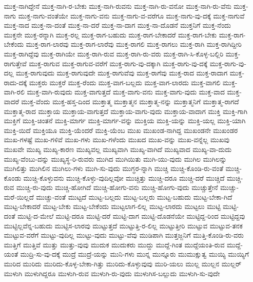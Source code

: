 {ಮುಕ್ತ-ನಾಗಿದ್ದೇನೆ
ಮುಕ್ತ-ನಾಗಿ-ರ-ಬೇಕು
ಮುಕ್ತ-ನಾಗಿ-ರುವನು
ಮುಕ್ತ-ನಾಗಿ-ರು-ವನೋ
ಮುಕ್ತ-ನಾಗಿ-ರು-ವೆನು
ಮುಕ್ತ-ನಾಗು
ಮುಕ್ತ-ನಾಗು-ವಂತೆಯೇ
ಮುಕ್ತ-ನಾಗು-ವನು
ಮುಕ್ತ-ನಾಗು-ವ-ವರೆಗೂ
ಮುಕ್ತ-ನಾಗು-ವು-ದಕ್ಕೆ
ಮುಕ್ತ-ನಾಗುವೆ
ಮುಕ್ತ-ನಾದ
ಮುಕ್ತ-ನಾ-ದಂತೆ
ಮುಕ್ತ-ನಾ-ದರೆ
ಮುಕ್ತ-ನಾ-ದಾಗ
ಮುಕ್ತ-ನಾ-ದೊಡನೆ
ಮುಕ್ತನಿಗೆ
ಮುಕ್ತ-ನೆಂದು
ಮುಕ್ತನೇ
ಮುಕ್ತ-ರನ್ನಾಗಿ
ಮುಕ್ತ-ರಲ್ಲ
ಮುಕ್ತ-ರಾಗ-ಬಹುದು
ಮುಕ್ತ-ರಾಗ-ಬೇಕಾದರೆ
ಮುಕ್ತ-ರಾಗ-ಬೇಕು
ಮುಕ್ತ-ರಾಗ-ಬೇಕೆಂದು
ಮುಕ್ತ-ರಾಗ-ಲಾರವು
ಮುಕ್ತ-ರಾಗ-ಲಾರೆವು
ಮುಕ್ತ-ರಾಗಲಿ
ಮುಕ್ತ-ರಾಗಲು
ಮುಕ್ತ-ರಾಗಿ
ಮುಕ್ತ-ರಾಗಿದ್ದೀರಿ
ಮುಕ್ತ-ರಾಗಿದ್ದೆವು
ಮುಕ್ತ-ರಾಗಿಯೇ
ಮುಕ್ತ-ರಾಗಿ-ರುವ
ಮುಕ್ತ-ರಾಗಿ-ರು-ವರು
ಮುಕ್ತ-ರಾಗಿ-ಸಿ-ಕೊಳ್ಳ-ಬಲ್ಲಿರಿ
ಮುಕ್ತ-ರಾಗುತ್ತೇವೆ
ಮುಕ್ತ-ರಾಗುವ
ಮುಕ್ತ-ರಾಗುವ-ವರೆಗೆ
ಮುಕ್ತ-ರಾಗು-ವು-ದಕ್ಕಾಗಿ
ಮುಕ್ತ-ರಾಗು-ವು-ದಕ್ಕೆ
ಮುಕ್ತ-ರಾಗು-ವು-ದಲ್ಲ
ಮುಕ್ತ-ರಾಗುವುದು
ಮುಕ್ತ-ರಾಗುವುದೇ
ಮುಕ್ತ-ರಾಗುವೆವು
ಮುಕ್ತ-ರಾಗೆವು
ಮುಕ್ತ-ರಾದ
ಮುಕ್ತ-ರಾದಾಗ
ಮುಕ್ತ-ರಾದು-ದಕ್ಕೆ
ಮುಕ್ತರು
ಮುಕ್ತರೆ
ಮುಕ್ತ-ರೆಂದು
ಮುಕ್ತ-ವಾಗ-ಬಲ್ಲದು
ಮುಕ್ತ-ವಾಗ-ಲಾರದು
ಮುಕ್ತ-ವಾಗಲಿ
ಮುಕ್ತ-ವಾಗಿ-ರಲಿ
ಮುಕ್ತ-ವಾಗಿ-ರುವುದು
ಮುಕ್ತ-ವಾಗುತ್ತದೆ
ಮುಕ್ತ-ವಾಗು-ವನು
ಮುಕ್ತ-ವಾಗು-ವುದು
ಮುಕ್ತ-ವಾದ
ಮುಕ್ತ-ವಾದರೆ
ಮುಕ್ತ-ವೆಂದು
ಮುಕ್ತ-ಹಸ್ತ-ದಿಂದ
ಮುಕ್ತಾತ್ಮ
ಮುಕ್ತಾತ್ಮನ
ಮುಕ್ತಾತ್ಮ-ನನ್ನು
ಮುಕ್ತಾತ್ಮನಿಗೆ
ಮುಕ್ತಾತ್ಮ-ರಾಗದೆ
ಮುಕ್ತಾತ್ಮ-ರಾದ
ಮುಕ್ತಾಯ
ಮುಕ್ತಾಯ-ವಾಗುತ್ತದೆ
ಮುಕ್ತಾಯ-ವಾಗು-ವುದು
ಮುಕ್ತಾಯ-ವಾದಾಗ
ಮುಕ್ತಿ
ಮುಕ್ತಿ-ಗಾಗಿ
ಮುಕ್ತಿಗೆ
ಮುಕ್ತಿ-ಚಿಂತನೆ
ಮುಕ್ತಿ-ಮಾರ್ಗ
ಮುಕ್ತಿ-ಮಾರ್ಗ-ವನ್ನು
ಮುಕ್ತಿಯ
ಮುಕ್ತಿ-ಯನ್ನು
ಮುಕ್ತಿ-ಯಲ್ಲ
ಮುಕ್ತಿ-ಯಾಗಿ
ಮುಕ್ತಿ-ಯಿದೆ
ಮುಕ್ತಿಯೂ
ಮುಕ್ತಿ-ಯೆಂದರೆ
ಮುಕ್ತಿ-ಯೆಂಬ
ಮುಖ
ಮುಖಂಡ-ನಾಗಿದ್ದ
ಮುಖಂಡನೇ
ಮುಖಂಡರ
ಮುಖ-ಗಳಷ್ಟೆ
ಮುಖ-ಗಳಿವೆ
ಮುಖ-ಗಳು
ಮುಖ-ಗಳೆಂದು
ಮುಖದ
ಮುಖ-ವನ್ನು
ಮುಖ-ವನ್ನೆಲ್ಲ
ಮುಖವು
ಮುಖವೇ
ಮುಖ್ಯ
ಮುಖ್ಯ-ಕಾರಣ
ಮುಖ್ಯವಲ್ಲ
ಮುಖ್ಯವಾಗಿ
ಮುಖ್ಯ-ವಾಗಿದೆ
ಮುಖ್ಯವಾದ
ಮುಖ್ಯ-ವಾ-ದುದು
ಮುಖ್ಯ-ವೆಂಬು-ದನ್ನು
ಮುಖ್ಯಸ್ಥ-ರಿ-ರುವರು
ಮುಗಿದ
ಮುಗಿಯಿತು
ಮುಗಿ-ಯು-ವುದು
ಮುಗಿಲ
ಮುಗಿಲನ್ನು
ಮುಗಿಲಿತ್ತು
ಮುಗಿಲಿನ
ಮುಗಿಲು-ಗಳು
ಮುಗಿ-ಸು-ವುದು
ಮುಗ್ಧರ-ನ್ನಾಗಿ
ಮುಚ್ಚಿ
ಮುಚ್ಚಿ-ಕೊಂಡಿ-ರು-ವಂತೆ
ಮುಚ್ಚಿ-ಕೊಂಡು
ಮುಚ್ಚಿ-ಕೊಳ್ಳುವನು
ಮುಚ್ಚಿ-ಕೊಳ್ಳು-ವುದಿಲ್ಲವೋ
ಮುಚ್ಚಿತ್ತು
ಮುಚ್ಚಿ-ದರೂ
ಮುಚ್ಚಿ-ದರೆ
ಮುಚ್ಚಿದೆ
ಮುಚ್ಚಿ-ರುವ
ಮುಚ್ಚಿ-ರು-ವುದು
ಮುಚ್ಚಿ-ಹೋಗಿದೆ
ಮುಚ್ಚಿ-ಹೋಗು-ವನು
ಮುಚ್ಚಿ-ಹೋಗು-ವುದು
ಮುಚ್ಚುತ್ತೇನೆ
ಮುಚ್ಚು-ಮರೆ-ಯಿಲ್ಲದೆ
ಮುಚ್ಚು-ವಂತೆ
ಮುಟ್ಟದೆ
ಮುಟ್ಟ-ಬಲ್ಲದು
ಮುಟ್ಟ-ಬಲ್ಲರು
ಮುಟ್ಟ-ಬಹುದು
ಮುಟ್ಟ-ಬೇಕಾ-ಗಿದೆ
ಮುಟ್ಟ-ಬೇಕಾದರೆ
ಮುಟ್ಟ-ಬೇಕು
ಮುಟ್ಟ-ಬೇಕೆಂದು
ಮುಟ್ಟಲಾಗ-ಲಿಲ್ಲ
ಮುಟ್ಟ-ಲಾರದು
ಮುಟ್ಟಲು
ಮುಟ್ಟಿ
ಮುಟ್ಟಿ-ದಂತೆ
ಮುಟ್ಟಿ-ದ-ಮೇಲೆ
ಮುಟ್ಟಿ-ದರೂ
ಮುಟ್ಟಿ-ದರೆ
ಮುಟ್ಟಿ-ದಾಗ
ಮುಟ್ಟಿ-ದೊಡನೆಯೇ
ಮುಟ್ಟಿದ್ದ-ರಿಂದ
ಮುಟ್ಟಿದ್ದವು
ಮುಟ್ಟಿಲ್ಲವೆನ್ನ-ಬಹುದು
ಮುಟ್ಟಿಸ-ಲಾರವು
ಮುಟ್ಟುತ್ತದೆ
ಮುಟ್ಟುತ್ತಿ-ರ-ಲಿಲ್ಲ
ಮುಟ್ಟುತ್ತೀರಿ
ಮುಟ್ಟುವ
ಮುಟ್ಟುವ-ತನಕ
ಮುಟ್ಟುವ-ವರೆಗೆ
ಮುಟ್ಟು-ವುದಿಲ್ಲ
ಮುಟ್ಟು-ವುದು
ಮುಟ್ಟು-ವೆವು
ಮುಡಿಪಾಗಿ
ಮುತ್ತಜ್ಜನಿಗೆ
ಮುತ್ತಿ-ಕೊಂಡಿ-ರು-ವರು
ಮುತ್ತಿಗೆ
ಮುತ್ತಿವೆ
ಮುತ್ತು
ಮುತ್ತು-ವುವು
ಮುದುಕ
ಮುದುಕರು
ಮುದ್ದು
ಮುದ್ದೆ-ಗಿಂತ
ಮುದ್ದೆಯಂತಿ-ರುವ
ಮುದ್ದೆ-ಯಂತೆ
ಮುದ್ರಿ-ಸು-ವು-ದಕ್ಕೆ
ಮುದ್ರೆ
ಮುದ್ರೆ-ಯನ್ನು
ಮುನಿ-ಗಳು
ಮುನ್ನ
ಮುನ್ನೂರು
ಮುಮುಕ್ಷುತ್ವ
ಮುಯ್ಯಿ
ಮುಯ್ಯಿಗೆ
ಮುರಿದ
ಮುರಿದು
ಮುರಿದು-ಕೊಳ್ಳ-ಬೇಕಾ-ಗಿತ್ತು
ಮುರಿದು-ಕೊಳ್ಳುವುವು
ಮುರಿ-ಯಲು
ಮುಲ್ಲ
ಮುಲ್ಲನ
ಮುಲ್ಲರ್
ಮುಳುಗಿ
ಮುಳುಗಿದ್ದರೂ
ಮುಳುಗಿ-ರುವ
ಮುಳುಗಿ-ರು-ವುದು
ಮುಳುಗಿಸ-ಬಲ್ಲುದು
ಮುಳುಗಿ-ಸು-ವುದೇ
}
